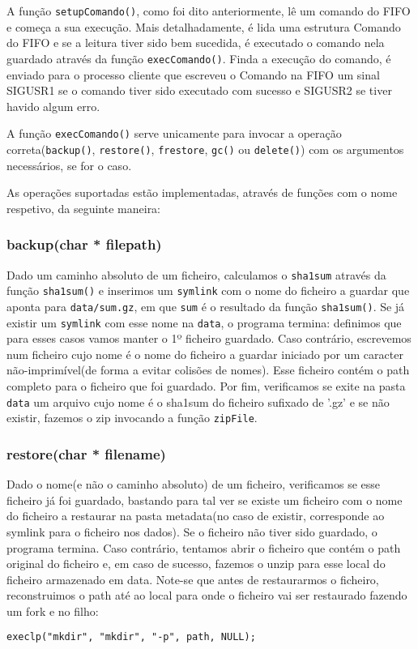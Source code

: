 A função \texttt{setupComando()}, como foi dito anteriormente, lê um comando do FIFO e começa a sua execução. Mais detalhadamente, é lida uma estrutura 
Comando do FIFO e se a leitura tiver sido bem sucedida, é executado o comando nela guardado através da função \texttt{execComando()}. Finda a execução do comando,
é enviado para o processo cliente que escreveu o Comando na FIFO um sinal SIGUSR1 se o comando tiver sido executado com sucesso e SIGUSR2 se tiver havido algum
erro.

A função \texttt{execComando()} serve unicamente para invocar a operação correta(\texttt{backup()}, \texttt{restore()}, \texttt{frestore}, \texttt{gc()} ou \texttt{delete()})
com os argumentos necessários, se for o caso.

As operações suportadas estão implementadas, através de funções com o nome respetivo, da seguinte maneira:
\subsubsection{backup(char * filepath)}
Dado um caminho absoluto de um ficheiro, calculamos o \texttt{sha1sum} através da função \texttt{sha1sum()} e inserimos um \texttt{symlink} com o nome do ficheiro a guardar que aponta
para \texttt{data/sum.gz}, em que \texttt{sum} é o resultado da função \texttt{sha1sum()}. Se já existir um \texttt{symlink} com esse nome na \texttt{data},
o programa termina: definimos que para esses casos vamos manter o 1º ficheiro guardado. Caso contrário, escrevemos num ficheiro cujo nome é o nome do ficheiro a 
guardar iniciado por um caracter não-imprimível(de forma a evitar colisões de nomes). Esse ficheiro contém o path completo para o ficheiro que foi guardado.
Por fim, verificamos se exite na pasta \texttt{data} um arquivo cujo nome é o sha1sum do ficheiro sufixado de '.gz' e se não existir, fazemos o zip invocando a função \texttt{zipFile}.

\subsubsection{restore(char * filename)}
Dado o nome(e não o caminho absoluto) de um ficheiro, verificamos se esse ficheiro já foi guardado, bastando para tal ver se existe um ficheiro com
o nome do ficheiro a restaurar na pasta metadata(no caso de existir, corresponde ao symlink para o ficheiro nos dados). Se o ficheiro não tiver sido guardado, o programa termina.
Caso contrário, tentamos abrir o ficheiro que contém o path original do ficheiro e, em caso de sucesso, fazemos o unzip para esse local do ficheiro 
armazenado em data. Note-se que antes de restaurarmos o ficheiro, reconstruimos o path até ao local para onde o ficheiro vai ser restaurado
fazendo um fork e no filho:
\begin{verbatim}
execlp("mkdir", "mkdir", "-p", path, NULL);
\end{verbatim}

